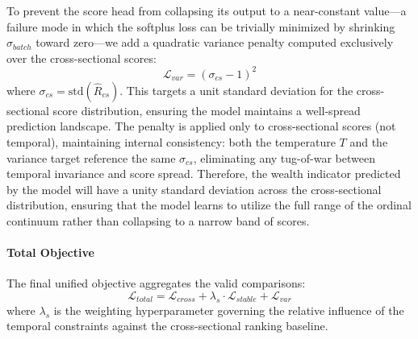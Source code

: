 \documentclass[conference]{IEEEtran}
\begin{document}
To prevent the score head from collapsing its output to a near-constant value---a failure mode in which the softplus loss can be trivially minimized by shrinking $\sigma_{batch}$ toward zero---we add a quadratic variance penalty computed exclusively over the cross-sectional scores:
\begin{equation}
\mathcal{L}_{var} = \left(\sigma_{cs} - 1\right)^2
\end{equation}
where $\sigma_{cs} = \text{std}(\hat{R}_{cs})$. This targets a unit standard deviation for the cross-sectional score distribution, ensuring the model maintains a well-spread prediction landscape. The penalty is applied only to cross-sectional scores (not temporal), maintaining internal consistency: both the temperature $T$ and the variance target reference the same $\sigma_{cs}$, eliminating any tug-of-war between temporal invariance and score spread. Therefore, the wealth indicator predicted by the model will have a unity standard deviation across the cross-sectional distribution, ensuring that the model learns to utilize the full range of the ordinal continuum rather than collapsing to a narrow band of scores.

\paragraph{Total Objective}

The final unified objective aggregates the valid comparisons:
\begin{equation}
\mathcal{L}_{total} = \mathcal{L}_{cross} + \lambda_{s} \cdot \mathcal{L}_{stable} + \mathcal{L}_{var}
\end{equation}
where $\lambda_s$ is the weighting hyperparameter governing the relative influence of the temporal constraints against the cross-sectional ranking baseline.
\end{document}
